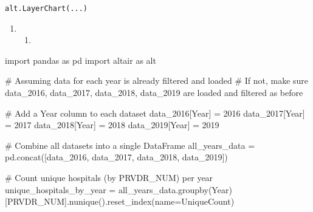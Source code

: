 \documentclass[
  letterpaper,
  DIV=11,
  numbers=noendperiod]{scrartcl}
\newenvironment{Shaded}{\begin{snugshade}}{\end{snugshade}}
\newcommand{\CommentTok}[1]{\textcolor[rgb]{0.37,0.37,0.37}{#1}}
\newcommand{\DecValTok}[1]{\textcolor[rgb]{0.68,0.00,0.00}{#1}}
\newcommand{\ImportTok}[1]{\textcolor[rgb]{0.00,0.46,0.62}{#1}}
\newcommand{\NormalTok}[1]{\textcolor[rgb]{0.00,0.23,0.31}{#1}}
\newcommand{\OperatorTok}[1]{\textcolor[rgb]{0.37,0.37,0.37}{#1}}
\newcommand{\StringTok}[1]{\textcolor[rgb]{0.13,0.47,0.30}{#1}}
\providecommand{\tightlist}{%
  \setlength{\itemsep}{0pt}\setlength{\parskip}{0pt}}\usepackage{longtable,booktabs,array}
\begin{document}
\begin{verbatim}
alt.LayerChart(...)
\end{verbatim}

\begin{enumerate}
\def\labelenumi{\arabic{enumi}.}
\setcounter{enumi}{3}
\tightlist
\item
  \begin{enumerate}
  \def\labelenumii{\alph{enumii}.}
  \tightlist
  \item
  \end{enumerate}
\end{enumerate}

\begin{Shaded}
\begin{Highlighting}[]
\ImportTok{import}\NormalTok{ pandas }\ImportTok{as}\NormalTok{ pd}
\ImportTok{import}\NormalTok{ altair }\ImportTok{as}\NormalTok{ alt}

\CommentTok{\# Assuming data for each year is already filtered and loaded}
\CommentTok{\# If not, make sure data\_2016, data\_2017, data\_2018, data\_2019 are loaded and filtered as before}

\CommentTok{\# Add a \textquotesingle{}Year\textquotesingle{} column to each dataset}
\NormalTok{data\_2016[}\StringTok{\textquotesingle{}Year\textquotesingle{}}\NormalTok{] }\OperatorTok{=} \DecValTok{2016}
\NormalTok{data\_2017[}\StringTok{\textquotesingle{}Year\textquotesingle{}}\NormalTok{] }\OperatorTok{=} \DecValTok{2017}
\NormalTok{data\_2018[}\StringTok{\textquotesingle{}Year\textquotesingle{}}\NormalTok{] }\OperatorTok{=} \DecValTok{2018}
\NormalTok{data\_2019[}\StringTok{\textquotesingle{}Year\textquotesingle{}}\NormalTok{] }\OperatorTok{=} \DecValTok{2019}

\CommentTok{\# Combine all datasets into a single DataFrame}
\NormalTok{all\_years\_data }\OperatorTok{=}\NormalTok{ pd.concat([data\_2016, data\_2017, data\_2018, data\_2019])}

\CommentTok{\# Count unique hospitals (by PRVDR\_NUM) per year}
\NormalTok{unique\_hospitals\_by\_year }\OperatorTok{=}\NormalTok{ all\_years\_data.groupby(}\StringTok{\textquotesingle{}Year\textquotesingle{}}\NormalTok{)[}\StringTok{\textquotesingle{}PRVDR\_NUM\textquotesingle{}}\NormalTok{].nunique().reset\_index(name}\OperatorTok{=}\StringTok{\textquotesingle{}UniqueCount\textquotesingle{}}\NormalTok{)}


\end{Highlighting}
\end{Shaded}
\end{document}
